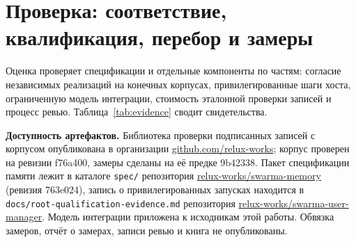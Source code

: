 \documentclass[10pt,a4paper]{article}
\begin{document}
\section{Проверка: соответствие, квалификация, перебор и замеры}
\label{sec:eval}

Оценка проверяет спецификации и отдельные компоненты по частям: согласие независимых реализаций на конечных корпусах, привилегированные шаги хоста, ограниченную модель интеграции, стоимость эталонной проверки записей и процесс ревью. Таблица~\ref{tab:evidence} сводит свидетельства.

\textbf{Доступность артефактов.} Библиотека проверки подписанных записей с корпусом опубликована в организации \href{https://github.com/relux-works}{github.com/relux-works}; корпус проверен на ревизии f76a400, замеры сделаны на её предке 9b42338. Пакет спецификации памяти лежит в каталоге \texttt{spec/} репозитория \href{https://github.com/relux-works/swarma-memory}{relux-works/swarma-memory} (ревизия 763e024), запись о привилегированных запусках находится в \texttt{docs/root-qualification-evidence.md} репозитория \href{https://github.com/relux-works/swarma-user-manager}{relux-works/swarma-user-manager}. Модель интеграции приложена к исходникам этой работы. Обвязка замеров, отчёт о замерах, записи ревью и книга \cite{swarmabook} не опубликованы.
\end{document}
